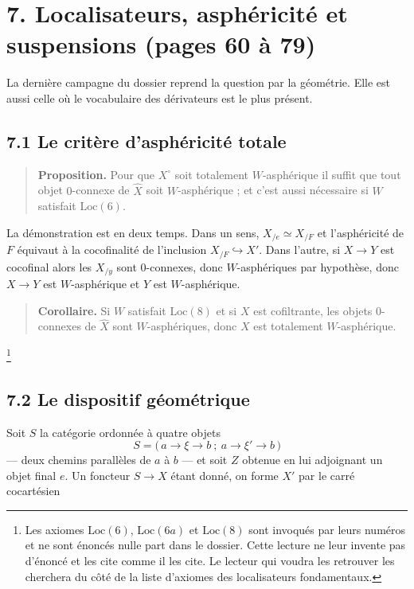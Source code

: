\documentclass[11pt,a4paper]{article}
\begin{document}
\section*{7. Localisateurs, asphéricité et suspensions (pages 60 à 79)}

La dernière campagne du dossier reprend la question par la géométrie. Elle est
aussi celle où le vocabulaire des dérivateurs est le plus présent.

\subsection*{7.1 Le critère d'asphéricité totale}

\begin{quote}
\textbf{Proposition.} Pour que $X^{\circ}$ soit totalement $W$-asphérique il
suffit que tout objet $0$-connexe de $\widehat{X}$ soit $W$-asphérique ; et
c'est aussi nécessaire si $W$ satisfait $\mathrm{Loc}(6)$.
\end{quote}

La démonstration est en deux temps. Dans un sens, $X_{/e} \simeq X_{/F}$ et
l'asphéricité de $F$ équivaut à la cocofinalité de l'inclusion
$X_{/F} \hookrightarrow X'$. Dans l'autre, si $X \to Y$ est cocofinal alors
les $X_{/y}$ sont $0$-connexes, donc $W$-asphériques par hypothèse, donc
$X \to Y$ est $W$-asphérique et $Y$ est $W$-asphérique.

\begin{quote}
\textbf{Corollaire.} Si $W$ satisfait $\mathrm{Loc}(8)$ et si $X$ est
cofiltrante, les objets $0$-connexes de $\widehat{X}$ sont $W$-asphériques,
donc $X$ est totalement $W$-asphérique.
\end{quote}

\footnote{Les axiomes $\mathrm{Loc}(6)$, $\mathrm{Loc}(6a)$ et
$\mathrm{Loc}(8)$ sont invoqués par leurs numéros et ne sont énoncés nulle part
dans le dossier. Cette lecture ne leur invente pas d'énoncé et les cite comme
il les cite. Le lecteur qui voudra les retrouver les cherchera du côté de la
liste d'axiomes des localisateurs fondamentaux.}

\subsection*{7.2 Le dispositif géométrique}

Soit $S$ la catégorie ordonnée à quatre objets
\[
  S = \bigl(\, a \to \xi \to b \ ; \ a \to \xi' \to b \,\bigr)
\]
— deux chemins parallèles de $a$ à $b$ — et soit $Z$ obtenue en lui adjoignant
un objet final $e$. Un foncteur $S \to X$ étant donné, on forme $X'$ par le
carré cocartésien
\end{document}
